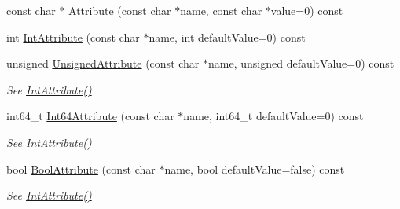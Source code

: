 \begin{DoxyCompactItemize}
\item 
const char $\ast$ \hyperlink{classCPlantBox_1_1tinyxml2_1_1XMLElement_a067223f76bebc06861d44386511d4ce8}{Attribute} (const char $\ast$name, const char $\ast$value=0) const
\item 
int \hyperlink{classCPlantBox_1_1tinyxml2_1_1XMLElement_ac0bb2fd733415649e95c36b08a7b700e}{Int\+Attribute} (const char $\ast$name, int default\+Value=0) const
\item 
\mbox{\label{classCPlantBox_1_1tinyxml2_1_1XMLElement_aa8aef094e7f1518f7501b19bcecda35e}} 
unsigned \hyperlink{classCPlantBox_1_1tinyxml2_1_1XMLElement_aa8aef094e7f1518f7501b19bcecda35e}{Unsigned\+Attribute} (const char $\ast$name, unsigned default\+Value=0) const
\begin{DoxyCompactList}\small\item\em See \hyperlink{classCPlantBox_1_1tinyxml2_1_1XMLElement_ac0bb2fd733415649e95c36b08a7b700e}{Int\+Attribute()} \end{DoxyCompactList}\item 
\mbox{\label{classCPlantBox_1_1tinyxml2_1_1XMLElement_a015b6a88f089232d6a80e2bb7068f3ad}} 
int64\+\_\+t \hyperlink{classCPlantBox_1_1tinyxml2_1_1XMLElement_a015b6a88f089232d6a80e2bb7068f3ad}{Int64\+Attribute} (const char $\ast$name, int64\+\_\+t default\+Value=0) const
\begin{DoxyCompactList}\small\item\em See \hyperlink{classCPlantBox_1_1tinyxml2_1_1XMLElement_ac0bb2fd733415649e95c36b08a7b700e}{Int\+Attribute()} \end{DoxyCompactList}\item 
\mbox{\label{classCPlantBox_1_1tinyxml2_1_1XMLElement_a2bbad0545f405b4d651f1949c1308c9e}} 
bool \hyperlink{classCPlantBox_1_1tinyxml2_1_1XMLElement_a2bbad0545f405b4d651f1949c1308c9e}{Bool\+Attribute} (const char $\ast$name, bool default\+Value=false) const
\begin{DoxyCompactList}\small\item\em See \hyperlink{classCPlantBox_1_1tinyxml2_1_1XMLElement_ac0bb2fd733415649e95c36b08a7b700e}{Int\+Attribute()} \end{DoxyCompactList}\item 
\mbox{\label{classCPlantBox_1_1tinyxml2_1_1XMLElement_abb3cb33b53c1fb5d21a4afa1d2dc2727}} 

\end{DoxyCompactItemize}
